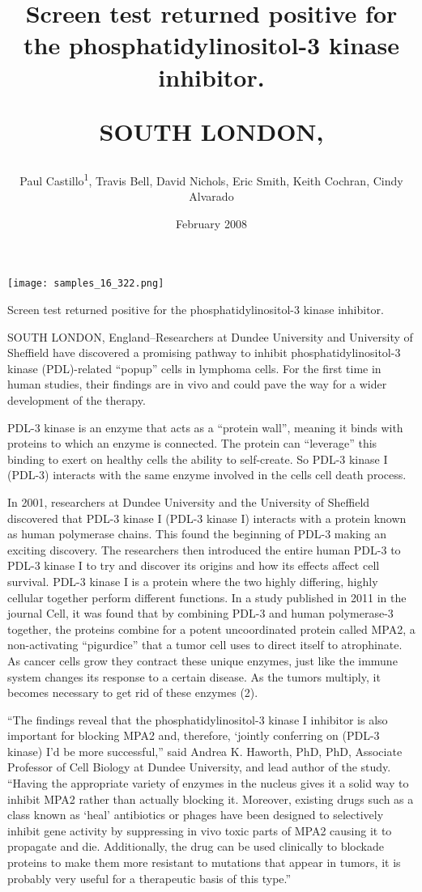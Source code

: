 \documentclass{article}
\title{Screen test returned positive for the phosphatidylinositol-3 kinase inhibitor.

SOUTH LONDON,}
\author{Paul Castillo\textsuperscript{1},  Travis Bell,  David Nichols,  Eric Smith,  Keith Cochran,  Cindy Alvarado}
\affil{\textsuperscript{1}Southern Medical University}
\date{February 2008}
\begin{document}
\maketitle

\begin{center}
\begin{minipage}{0.75\linewidth}
\texttt{[image: samples\_16\_322.png]}
\end{minipage}
\end{center}

Screen test returned positive for the phosphatidylinositol-3 kinase inhibitor.

SOUTH LONDON, England–Researchers at Dundee University and University of Sheffield have discovered a promising pathway to inhibit phosphatidylinositol-3 kinase (PDL)-related “popup” cells in lymphoma cells. For the first time in human studies, their findings are in vivo and could pave the way for a wider development of the therapy.

PDL-3 kinase is an enzyme that acts as a “protein wall”, meaning it binds with proteins to which an enzyme is connected. The protein can “leverage” this binding to exert on healthy cells the ability to self-create. So PDL-3 kinase I (PDL-3) interacts with the same enzyme involved in the cells cell death process.

In 2001, researchers at Dundee University and the University of Sheffield discovered that PDL-3 kinase I (PDL-3 kinase I) interacts with a protein known as human polymerase chains. This found the beginning of PDL-3 making an exciting discovery. The researchers then introduced the entire human PDL-3 to PDL-3 kinase I to try and discover its origins and how its effects affect cell survival. PDL-3 kinase I is a protein where the two highly differing, highly cellular together perform different functions. In a study published in 2011 in the journal Cell, it was found that by combining PDL-3 and human polymerase-3 together, the proteins combine for a potent uncoordinated protein called MPA2, a non-activating “pigurdice” that a tumor cell uses to direct itself to atrophinate. As cancer cells grow they contract these unique enzymes, just like the immune system changes its response to a certain disease. As the tumors multiply, it becomes necessary to get rid of these enzymes (2).

“The findings reveal that the phosphatidylinositol-3 kinase I inhibitor is also important for blocking MPA2 and, therefore, ‘jointly conferring on (PDL-3 kinase) I’d be more successful,” said Andrea K. Haworth, PhD, PhD, Associate Professor of Cell Biology at Dundee University, and lead author of the study. “Having the appropriate variety of enzymes in the nucleus gives it a solid way to inhibit MPA2 rather than actually blocking it. Moreover, existing drugs such as a class known as ‘heal’ antibiotics or phages have been designed to selectively inhibit gene activity by suppressing in vivo toxic parts of MPA2 causing it to propagate and die. Additionally, the drug can be used clinically to blockade proteins to make them more resistant to mutations that appear in tumors, it is probably very useful for a therapeutic basis of this type.”
\end{document}

